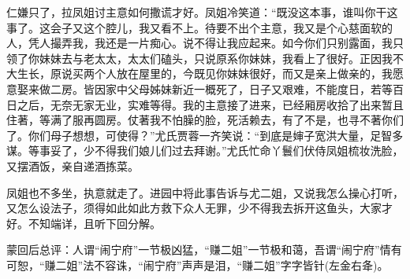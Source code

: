 \begin{parag}
仁嫌只了，拉凤姐讨主意如何撒谎才好。凤姐冷笑道：“既没这本事，谁叫你干这事了。这会子又这个腔儿，我又看不上。待要不出个主意，我又是个心慈面软的人，凭人撮弄我，我还是一片痴心。说不得让我应起来。如今你们只别露面，我只领了你妹妹去与老太太，太太们磕头，只说原系你妹妹，我看上了很好。正因我不大生长，原说买两个人放在屋里的，今既见你妹妹很好，而又是亲上做亲的，我愿意娶来做二房。皆因家中父母姊妹新近一概死了，日子又艰难，不能度日，若等百日之后，无奈无家无业，实难等得。我的主意接了进来，已经厢房收拾了出来暂且住著，等满了服再圆房。仗著我不怕臊的脸，死活赖去，有了不是，也寻不著你们了。你们母子想想，可使得？”尤氏贾蓉一齐笑说：“到底是婶子宽洪大量，足智多谋。等事妥了，少不得我们娘儿们过去拜谢。”尤氏忙命丫鬟们伏侍凤姐梳妆洗脸，又摆酒饭，亲自递酒拣菜。
\end{parag}


\begin{parag}
    凤姐也不多坐，执意就走了。进园中将此事告诉与尤二姐，又说我怎么操心打听，又怎么设法子，须得如此如此方救下众人无罪，少不得我去拆开这鱼头，大家才好。不知端详，且听下回分解。
\end{parag}


\begin{parag}
    \begin{note}蒙回后总评：人谓“闹宁府”一节极凶猛，“赚二姐”一节极和蔼，吾谓“闹宁府”情有可恕，“赚二姐”法不容诛，“闹宁府”声声是泪，“赚二姐”字字皆针(左金右夅)。\end{note}
\end{parag}
